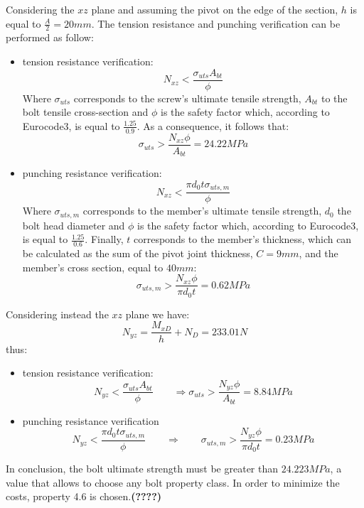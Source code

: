 Considering the $xz$ plane and assuming the pivot on the edge of the section, $h$ is equal to $\frac{A}{2} = 20 mm$. The tension resistance and punching verification can be performed as follow:
\begin{itemize}
    \item tension resistance verification:
    \begin{equation*}
        N_{xz} < \frac{\sigma_{uts}A_{bt}}{\phi}
    \end{equation*}
    Where $\sigma_{uts}$ corresponds to the screw's ultimate tensile strength, $A_{bt}$ to the bolt tensile cross-section and $\phi$ is the safety factor which, according to Eurocode3, is equal to $\frac{1.25}{0.9}$. As a consequence, it follows that:
    \begin{equation*}
       \sigma_{uts} > \frac{N_{xz}\phi}{A_{bt}} = 24.22 MPa
    \end{equation*}
    \item punching resistance verification:
    \begin{equation*}
        N_{xz} < \frac{\pi d_{0} t \sigma_{uts,m}}{\phi}
    \end{equation*}
    Where $\sigma_{uts,m}$ corresponds to the member's ultimate tensile strength, $d_{0}$ the bolt head diameter and $\phi$ is the safety factor which, according to Eurocode3, is equal to $\frac{1.25}{0.6}$. Finally, $t$ corresponds to the member's thickness, which can be calculated as the sum of the pivot joint thickness, $C = 9 mm$, and the member's cross section, equal to $40 mm$:
     \begin{equation*}
       \sigma_{uts,m} > \frac{N_{xz}\phi}{\pi d_{0}t} = 0.62 MPa
    \end{equation*}
\end{itemize}
Considering instead the $xz$ plane we have:\\
\begin{equation*}
    N_{yz} = \frac{M_{xD}}{h} + N_{D} = 233.01 N
\end{equation*}
thus:
\begin{itemize}
    \item tension resistance verification:
    \begin{equation*}
        N_{yz} < \frac{\sigma_{uts}A_{bt}}{\phi} \qquad \Rightarrow \sigma_{uts} > \frac{N_{yz}\phi}{A_{bt}} = 8.84 MPa
    \end{equation*}
    \item punching resistance verification\\
    \begin{equation*}
        N_{yz} < \frac{\pi d_{0} t \sigma_{uts,m}}{\phi} \qquad \Rightarrow \qquad   \sigma_{uts,m} > \frac{N_{yz}\phi}{\pi d_{0}t} = 0.23 MPa
    \end{equation*}
\end{itemize}
In conclusion, the bolt ultimate strength must be greater than $24.223 MPa$, a value that allows to choose any bolt property class. In order to minimize the costs, property 4.6 is chosen.\textbf{(????)} 

